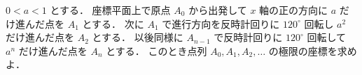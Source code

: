 \documentclass[../../main.tex]{subfiles}
\begin{document}
$0 < a < 1$ とする．
座標平面上で原点 $A_0$ から出発して $x$ 軸の正の方向に $a$ だけ進んだ点を $A_1$ とする．
次に $A_1$ で進行方向を反時計回りに $120^\circ$ 回転し $a^2$ だけ進んだ点を $A_2$ とする．
以後同様に $A_{n-1}$ で反時計回りに $120^\circ$ 回転して $a^n$ だけ進んだ点を $A_n$ とする．
このとき点列 $A_0, A_1, A_2, \dots$ の極限の座標を求めよ．
\end{document}
